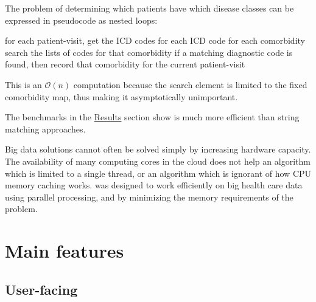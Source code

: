 \documentclass[article]{jss}
\begin{document}
The problem of determining which patients have which disease classes can
be expressed in pseudocode as nested loops:

\begin{Code}
for each patient-visit, get the ICD codes
  for each ICD code
    for each comorbidity
      search the lists of codes for that comorbidity
      if a matching diagnostic code is found, then
        record that comorbidity for the current patient-visit
\end{Code}

\label{pseudocode}

This is an \(\mathcal{O}(n)\) computation because the search element is
limited to the fixed comorbidity map, thus making it asymptotically
unimportant.

The benchmarks in the \protect\hyperlink{results}{Results} section show
 is much more efficient than string matching approaches.

Big data solutions cannot often be solved simply by increasing hardware
capacity. The availability of many computing cores in the cloud does not
help an algorithm which is limited to a single thread, or an algorithm
which is ignorant of how CPU memory caching works.  was
designed to work efficiently on big health care data using parallel
processing, and by minimizing the memory requirements of the problem.

\section{Main features}\label{main-features}

\subsection{User-facing}\label{user-facing}
\end{document}
